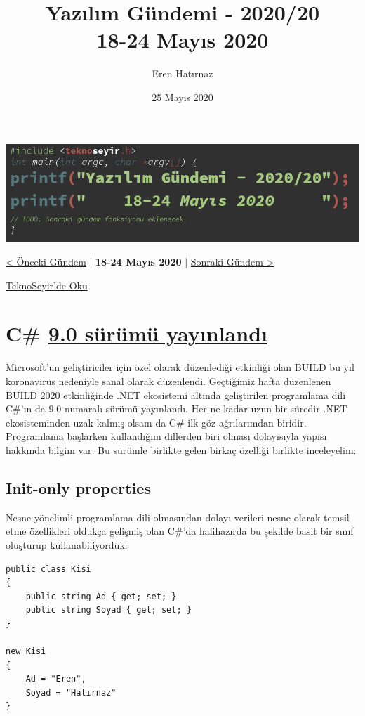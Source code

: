 \documentclass[11pt]{article}
\author{Eren Hatırnaz}
\date{25 Mayıs 2020}
\title{Yazılım Gündemi - 2020/20\\\medskip
\large 18-24 Mayıs 2020}
\begin{document}
\maketitle
\tableofcontents \clearpage\shorthandoff{=}

\begin{center}
\includegraphics[width=.9\linewidth]{gorseller/yazilim-gundemi-banner.png}
\end{center}

\begin{center}
\href{../19/yazilim-gundemi-2020-19.pdf}{< Önceki Gündem} | \textbf{18-24 Mayıs 2020} | \href{../21/yazilim-gundemi-2020-21.pdf}{Sonraki Gündem >}

\href{https://teknoseyir.com/blog/yazilim-gundemi-2020-20}{TeknoSeyir'de Oku}
\end{center}

\section{C\# \href{https://devblogs.microsoft.com/dotnet/welcome-to-c-9-0/}{9.0 sürümü yayınlandı}}
\label{sec:org45ab6aa}
Microsoft'un geliştiriciler için özel olarak düzenlediği etkinliği olan BUILD
bu yıl koronavirüs nedeniyle sanal olarak düzenlendi. Geçtiğimiz hafta
düzenlenen BUILD 2020 etkinliğinde .NET ekosistemi altında geliştirilen
programlama dili C\#'ın da 9.0 numaralı sürümü yayınlandı. Her ne kadar uzun
bir süredir .NET ekosisteminden uzak kalmış olsam da C\# ilk göz ağrılarımdan
biridir. Programlama başlarken kullandığım dillerden biri olması dolayısıyla
yapısı hakkında bilgim var. Bu sürümle birlikte gelen birkaç özelliği birlikte
inceleyelim:

\subsection{Init-only properties}
\label{sec:org2911119}
Nesne yönelimli programlama dili olmasından dolayı verileri nesne olarak
temsil etme özellikleri oldukça gelişmiş olan C\#'da halihazırda bu şekilde
basit bir sınıf oluşturup kullanabiliyorduk:

\begin{verbatim}
public class Kisi
{
    public string Ad { get; set; }
    public string Soyad { get; set; }
}

new Kisi
{
    Ad = "Eren",
    Soyad = "Hatırnaz"
}
\end{verbatim}
\end{document}
